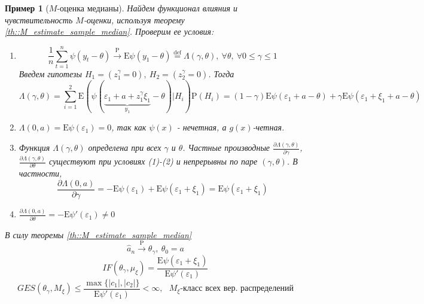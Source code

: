\documentclass[12pt]{article}
\newtheorem*{example}{Пример}
\theoremstyle{basic_theorem}
\theoremstyle{name_theorem}
\newcommand*{\defeq}{\stackrel{\text{def}}{=}}
\def\eps{ \varepsilon }
\def\E{ \mathrm{E} }
\def\P{ \mathrm{P} }
\begin{document}
\begin{example}[$M$-оценка медианы]
     Найдем функционал влияния и чувствительность $M$-оценки, используя теорему \ref{th::M_estimate_sample_median}.
     Проверим ее условия:
     \begin{enumerate}
         \item 
         \[\frac{1}{n}\sum_{t=1}^n\psi(y_t-\theta)\xrightarrow{\P}\E\psi(y_1-\theta)\defeq\Lambda(\gamma,\theta),\ \forall\theta,\ \forall0\leq\gamma\leq1\]
         Введем гипотезы $H_1=(z_1^\gamma=0),\ H_2=(z_2^\gamma=0)$. Тогда 
         \[\Lambda(\gamma,\theta)=\sum_{i=1}^2\E(\psi(\underbrace{\eps_1+a+z_1^\gamma\xi_1}_{y_1}-\theta)\vert H_i)\P(H_i)
         =(1-\gamma)\E\psi(\eps_1+a-\theta)+\gamma\E\psi(\eps_1+\xi_1+a-\theta)\]
         \item $\Lambda(0,a)=\E\psi(\eps_1)=0$, так как $\psi(x)$ - нечетная, а $g(x)$-четная.
         \item Функция $\Lambda(\gamma,\theta)$ определена при всех $\gamma$ и $\theta$.
         Частные производные $\frac{\partial\Lambda(\gamma,\theta)}{\partial\gamma}$, $\frac{\partial\Lambda(\gamma,\theta)}{\partial\theta}$
         существуют при условиях (1)-(2) и непрерывны по паре $(\gamma,\theta)$. В частности,
         \[\frac{\partial\Lambda(0,a)}{\partial\gamma}=-\E\psi(\eps_1)+\E\psi(\eps_1+\xi_1)=\E\psi(\eps_1+\xi_1)\]
         \item $\frac{\partial\Lambda(0,a)}{\partial\theta}=-\E\psi'(\eps_1)\neq0$
     \end{enumerate}
     В силу теоремы \ref{th::M_estimate_sample_median} 
    \[\widehat{a}_n\xrightarrow{\P}\theta_\gamma,\ \theta_0=a \]
    \[IF(\theta_\gamma,\mu_\xi)=\frac{\E\psi(\eps_1+\xi_1)}{\E\psi'(\eps_1)} \]
    \[GES(\theta_\gamma, M_\xi)\leq\frac{\max\{|c_1|,|c_2|\}}{\E\psi'(\eps_1)}<\infty,\text{ $M_\xi$-класс всех вер. распределений}\]
\end{example}
\end{document}
